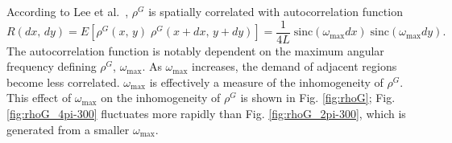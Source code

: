 \documentclass[12pt,dvipsnames]{report}
\begin{document}
According to Lee et al.~\cite{6554749}, $\rho^G$ is spatially correlated with autocorrelation function
\begin{equation} \label{eq:sslt_autocorrelation}
R\left(dx,\, dy\right) = E\left[\rho^G\left(x,\, y\right) \; \rho^G\left(x+dx,\, y+dy\right)\right]=\frac{1}{4L} \; \text{sinc}\left(\omega_{\max}dx\right) \; \text{sinc}\left(\omega_{\max}dy\right).
\end{equation}
The autocorrelation function is notably dependent on the maximum angular frequency defining $\rho^G$, $\omega_{\max}$.  As $\omega_{\max}$ increases, the demand of adjacent regions become less correlated.  $\omega_{\max}$ is effectively a measure of the inhomogeneity of $\rho^G$.  This effect of $\omega_{\max}$ on the inhomogeneity of $\rho^G$ is shown in Fig. \ref{fig:rhoG}; Fig. \ref{fig:rhoG_4pi-300} fluctuates more rapidly than Fig. \ref{fig:rhoG_2pi-300}, which is generated from a smaller $\omega_{\max}$.
\end{document}
